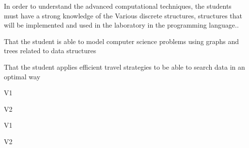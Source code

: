 \begin{syllabus}


\begin{justification}
In order to understand the advanced computational techniques, the students must have a strong knowledge of the
Various discrete structures, structures that will be implemented and used in the laboratory in the programming language..
\end{justification}

\begin{goals}
\item That the student is able to model computer science problems using graphs and trees related to data structures
\item That the student applies efficient travel strategies to be able to search data in an optimal way
\end{goals}

\begin{outcomes}{V1}
    \item {}
    \item {}	
    \item {}
\end{outcomes}

\begin{outcomes}{V2}
    \item {}
    \item {}	
    \item {}
\end{outcomes}

\begin{competences}{V1}
    \item {}
    \item {}
    \item {}
\end{competences}

\begin{competences}{V2}
    \item {}
    \item {}
    \item {}
\end{competences}


\end{syllabus}
